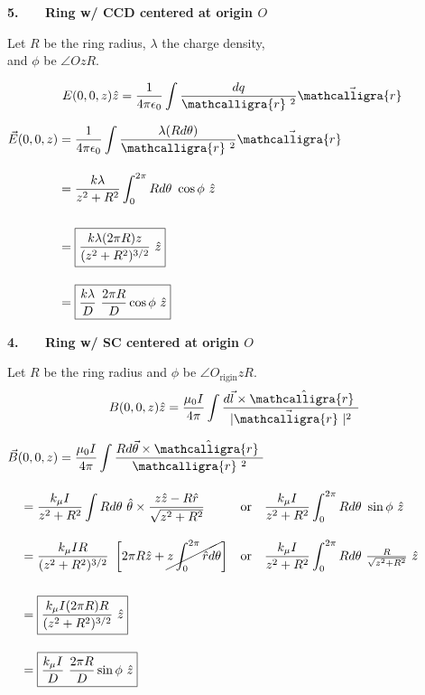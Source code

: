 \documentclass[12pt]{article}
\newcommand{\scripty}[1]{\ensuremath{\mathcalligra{#1}}}
\newcommand*{\cursrr}{\scripty{r}\ }
\begin{document}
\vspace{10pt}\noindent
\begin{minipage}[t]{.37\textwidth}
	\textbf{5. \ \ \ Ring w/ CCD centered at origin \(O\)}
	
	\vspace{10pt}
	Let \(R\) be the ring radius, \(\lambda\) the charge density, \\[7pt]
	and \(\phi\) be \(\angle OzR\).

	\vspace{5pt}
	\[ \displaystyle E(0,0,z) \hat{z} = \frac{1}{4 \pi \epsilon_0} \int \frac{dq}{\cursrr^2} \vec{\cursrr}\]

	\vspace{10pt}
	\(\begin{aligned}
		\vec{E}(0,0,z) &= \frac{1}{4 \pi \epsilon_0} \int \frac{\lambda (R d\theta)}{\cursrr^2} \vec{\cursrr}\\[10pt]
		&= \frac{k \lambda}{z^2 + R^2} \int_0^{2\pi} Rd\theta\ \cos{\phi}\ \hat{z} \\[15pt]
		&= \boxed{ \frac{k \lambda (2\pi R) z}{(z^2 + R^2)^{3/2}}\ \hat{z} }\\[10pt]
		&= \boxed{ \frac{k \lambda}{D}\ \frac{2\pi R}{D} \cos{\phi}\ \hat{z}}
	\end{aligned}\)
\end{minipage}
\hfill\vline\hfill
\begin{minipage}[t]{.57\textwidth}
	\textbf{4. \ \ \ Ring w/ SC centered at origin \(O\)}

	\vspace{10pt}
	Let \(R\) be the ring radius and \(\phi\) be \(\angle O_\text{rigin}zR\).
	\[ \displaystyle B(0,0,z) \hat{z} = \frac{\mu_0 I}{4 \pi} 
			\int \frac{ d\vec{l} \times \hat{\cursrr} }{| \vec{\cursrr} |^2} \]

	\vspace{5pt}
	\(\begin{aligned} 
		&\vec{B}(0,0,z) = \frac{\mu_0 I}{4 \pi} \int \frac{R d\vec{\theta} \times \hat{\cursrr}}{\cursrr^2}\\[10pt]
		&\ \ \ \begin{aligned}
			&= \frac{k_\mu I}{z^2 + R^2} \int R d\theta \ \hat{\theta} \times \frac{z\hat{z}-R\hat{r}}{\sqrt{z^2 + R^2}} 
				&&\text{or}\quad 
				\frac{k_\mu I}{z^2 + R^2} \int_0^{2\pi} R d\theta \ \sin{\phi}\ \hat{z}\\[10pt]
			&= \frac{k_\mu I R}{ (z^2 + R^2)^{3/2} } \ 
				\left[ 2 \pi R \hat{z} + \cancel{z \int_0^{2 \pi} \hat{r} d\theta} \right] 
				&&\text{or}\quad 
				\frac{k_\mu I}{z^2 + R^2} \int_0^{2\pi} R d\theta \ \tfrac{R}{\sqrt{z^2 + R^2}}\ \hat{z}\\[15pt]
			&= \boxed{ \frac{k_\mu I(2\pi R)R}{ (z^2 + R^2)^{3/2} } \ \hat{z} }\\[10pt]
			&= \boxed{ \frac{k_\mu I}{D}\ \frac{2\pi R}{D} \sin{\phi}\ \hat{z} }
		\end{aligned}
	\end{aligned}\)
\end{minipage}
\end{document}
